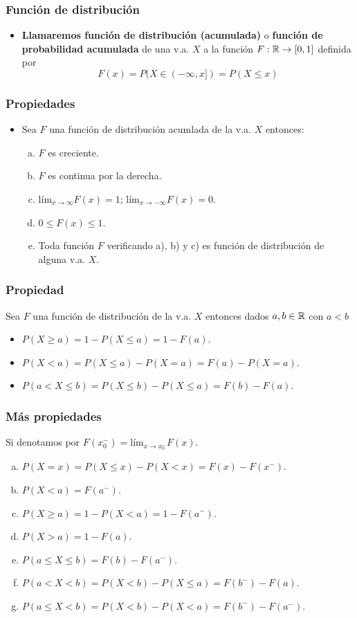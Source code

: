 \begin{frame}
\frametitle{Funci\'on de distribuci\'on}
\begin{itemize}
 \item  \textbf{Llamaremos funci\'on de distribuci\'on (acumulada)} o \textbf{funci\'on de probabilidad acumulada} de una v.a. $X$
a la funci\'on $F:\mathbb{R}\to [0,1]$ definida por
       $$F(x)=P(X\in (-\infty,x])=P(X\leq x)$$
\end{itemize}
\end{frame}

\begin{frame}
\frametitle{Propiedades}
\begin{itemize}
\item      Sea $F$ una funci\'on de  distribución acumlada de la v.a. $X$ entonces:
\begin{enumerate}[a)]
 \item $F$ es creciente.
 \item $F$ es continua por la derecha.
\item  $\displaystyle\mbox{lím}_{x\to\infty}F(x)=1$;
           $\mbox{lím}_{x\to-\infty}F(x)=0$.
\item $0\leq F(x)\leq 1$.
\item  Toda funci\'on $F$ verificando a), b) y c) es funci\'on de
           distribuci\'on de alguna v.a. $X$.
\end{enumerate}
\end{itemize}

\end{frame}

\begin{frame}
\frametitle{Propiedad}
Sea $F$ una funci\'on de distribuci\'on de la v.a. $X$ entonces dados $a,b\in\mathbb{R}$ con $a<b$
\begin{itemize}
\item $P(X\geq a)=1-P(X\leq a)=1-F(a)$.
\item $P(X<a)=P(X\leq a)-P(X=a)=F(a)-P(X=a)$.
\item $P(a<X\leq b)=P(X\leq b)-P(X\leq a)=F(b)-F(a)$.
\end{itemize}
\end{frame}

\begin{frame}
\frametitle{Más propiedades}

Si denotamos por $F(x_{0}^{-})=\mbox{lím}_{x\to x_{0}^{-}} F(x)$.
        
\begin{enumerate}[a)]
\item $P(X=x)=P(X\leq x)-P(X<x)=F(x)-F(x^{-})$.
\item $P(X<a)=F(a^{-})$.
\item $P(X\geq a)=1-P(X<a)=1-F(a^{-})$.
\item $P(X> a)=1-F(a)$.
\item $P(a\leq X\leq b)=F(b)-F(a^{-})$.
\item $P(a< X< b)=P(X<b)-P(X\leq a)=F(b^{-})-F(a)$.
\item $P(a\leq X< b)=P(X<b)-P(X< a)=F(b^{-})-F(a^{-})$.
\end{enumerate}
\end{frame}

